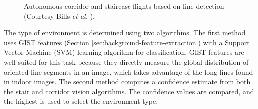 \begin{figure}[htb!]
  \begin{center}
\hspace{1cm}
   
  \end{center}
  \caption{Autonomous corridor and staircase flights based on line detection (Courtesy Bills \textit{et al.} \cite{Bills2011icra}).}
  \label{featureImg}
\end{figure}

The type of environment is determined using two algorithms.
The first method uses GIST features \cite{oliva2001modeling} (Section \ref{sec:background-feature-extraction}) with a Support Vector Machine (SVM) learning algorithm for classification.
GIST features are well-suited for this task because they directly measure the global distribution of oriented line segments in an image, which takes advantage of the long lines found in indoor images.
The second method computes a confidence estimate from both the stair and corridor vision algorithms.
The confidence values are compared, and the highest is used to select the environment type.

